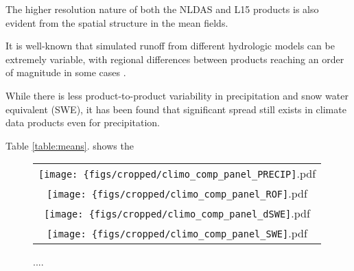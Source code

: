 \documentclass[draft]{agujournal2019}
\begin{document}
The higher resolution nature of both the NLDAS and L15 products is also evident from the spatial structure in the mean fields.

It is well-known that simulated runoff from different hydrologic models can be extremely variable, with regional differences between products reaching an order of magnitude in some cases \citep{gudmundsson2012comparing,sood2015global,beck2017global}. 

While there is less product-to-product variability in precipitation and snow water equivalent (SWE), it has been found that significant spread still exists in climate data products even for precipitation.

Table \ref{table:means}. shows the 


\begin{figure}
\begin{tabular}{c}
\texttt{[image: \{figs/cropped/climo\_comp\_panel\_PRECIP]}.pdf} \\
\texttt{[image: \{figs/cropped/climo\_comp\_panel\_ROF]}.pdf} \\
\texttt{[image: \{figs/cropped/climo\_comp\_panel\_dSWE]}.pdf} \\
\texttt{[image: \{figs/cropped/climo\_comp\_panel\_SWE]}.pdf}
\end{tabular}
\caption{....}
\label{fig:means}
\end{figure}
\end{document}
